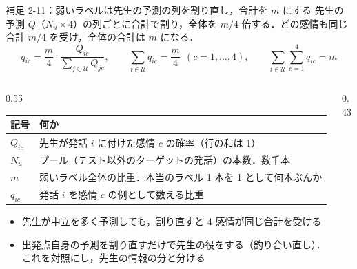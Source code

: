 \begin{frame}{補足 2-11：弱いラベルは先生の予測の列を割り直し，合計を $m$ にする}
  \label{s:p2:weak}
  \tighteq\scriptsize
  先生の予測 $Q$（$N_u\times 4$）の列ごとに合計で割り，全体を $m/4$ 倍する．どの感情も同じ合計 $m/4$ を受け，全体の合計は $m$ になる．
  \[
    q_{ic} = \frac{m}{4}\cdot\frac{Q_{ic}}{\sum_{j\in\mathcal U} Q_{jc}},\qquad
    \sum_{i\in\mathcal U} q_{ic} = \frac{m}{4}\ \ (c=1,\dots,4),\qquad
    \sum_{i\in\mathcal U}\sum_{c=1}^{4} q_{ic} = m
  \]
  \begin{columns}[T,onlytextwidth]
    \begin{column}{0.55\textwidth}
      \setlength{\tabcolsep}{3pt}\renewcommand{\arraystretch}{1.08}
      \begin{tabular}{@{}l p{6.0cm}@{}}
        \toprule
        記号 & 何か \\
        \midrule
        $Q_{ic}$ & 先生が発話 $i$ に付けた感情 $c$ の確率（行の和は 1） \\
        $N_u$ & プール（テスト以外のターゲットの発話）の本数．数千本 \\
        $m$ & 弱いラベル全体の比重．本当のラベル 1 本を 1 として何本ぶんか \\
        $q_{ic}$ & 発話 $i$ を感情 $c$ の例として数える比重 \\
        \bottomrule
      \end{tabular}\par
      \vspace{0.2em}
      \begin{itemize}\scriptsize\setlength{\itemsep}{2pt}
        \item 先生が中立を多く予測しても，割り直すと 4 感情が同じ合計を受ける
        \item 出発点自身の予測を割り直すだけで先生の役をする（釣り合い直し）．これを対照にし，先生の情報の分と分ける
      \end{itemize}
    \end{column}
    \begin{column}{0.43\textwidth}
      \centering
      \par
      \vspace{0.2em}
    \end{column}
  \end{columns}
\end{frame}

